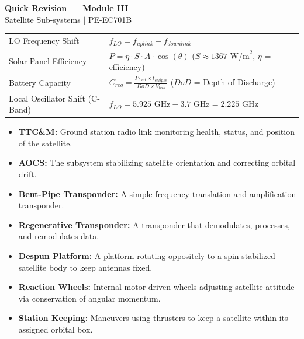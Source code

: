 \documentclass[12pt,a4paper]{article}
\renewcommand{\arraystretch}{1.45}
\begin{document}
\newpage
\begin{center}
  {\large\bfseries\color{myred} Quick Revision --- Module III}\\[3pt]
  {\small\color{mydark} Satellite Sub-systems $|$ PE-EC701B}
\end{center}
\noindent{\color{myred}\rule{\linewidth}{1.2pt}}
\vspace{4pt}

\begin{tcolorbox}[formulabox, title={\textbf{Key Formulas at a Glance}}]
\renewcommand{\arraystretch}{1.3}
\begin{tabularx}{\linewidth}{B{5.0cm} X}LO Frequency Shift & $f_{LO} = f_{uplink} - f_{downlink}$ \\[4pt]
Solar Panel Efficiency & $P = \eta \cdot S \cdot A \cdot \cos(\theta)$ \quad ($S \approx 1367 \text{ W/m}^2$, $\eta$ = efficiency) \\[4pt]
Battery Capacity & $C_{req} = \frac{P_{load} \times t_{eclipse}}{DoD \times V_{bus}}$ \quad ($DoD$ = Depth of Discharge) \\[4pt]
Local Oscillator Shift (C-Band) & $f_{LO} = 5.925\text{ GHz} - 3.7\text{ GHz} = 2.225\text{ GHz}$
\end{tabularx}
\end{tcolorbox}

\begin{tcolorbox}[defbox, title={\textbf{One-Line Definitions}}]
\begin{itemize}[leftmargin=*, itemsep=2.5pt, topsep=0pt]
  \item \textbf{TTC\&M:} Ground station radio link monitoring health, status, and position of the satellite.
  \item \textbf{AOCS:} The subsystem stabilizing satellite orientation and correcting orbital drift.
  \item \textbf{Bent-Pipe Transponder:} A simple frequency translation and amplification transponder.
  \item \textbf{Regenerative Transponder:} A transponder that demodulates, processes, and remodulates data.
  \item \textbf{Despun Platform:} A platform rotating oppositely to a spin-stabilized satellite body to keep antennas fixed.
  \item \textbf{Reaction Wheels:} Internal motor-driven wheels adjusting satellite attitude via conservation of angular momentum.
  \item \textbf{Station Keeping:} Maneuvers using thrusters to keep a satellite within its assigned orbital box.
\end{itemize}
\end{tcolorbox}
\end{document}
